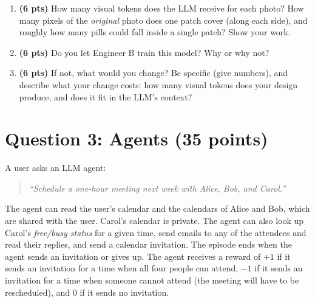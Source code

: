 \documentclass[11pt]{article}
\begin{document}
\begin{enumerate}[label=(\alph*)]
  \begin{enumerate}[label=(\roman*)]
    \item \textbf{(6 pts)} How many visual tokens does the LLM receive for each photo? How many pixels of the
    \emph{original} photo does one patch cover (along each side), and roughly how many pills could fall inside a
    single patch? Show your work.
    \item \textbf{(6 pts)} Do you let Engineer B train this model? Why or why not?
    \item \textbf{(6 pts)} If not, what would you change? Be specific (give numbers), and describe what your change
    costs: how many visual tokens does your design produce, and does it fit in the LLM's context?
  \end{enumerate}

\end{enumerate}

\section{Question 3: Agents (35 points)}

A user asks an LLM agent:
\begin{quote}
\emph{``Schedule a one-hour meeting next week with Alice, Bob, and Carol.''}
\end{quote}
The agent can read the user's calendar and the calendars of Alice and Bob, which are shared with the user. Carol's
calendar is private. The agent can also look up Carol's \emph{free/busy status} for a given time, send emails to
any of the attendees and read their replies, and send a calendar invitation. The episode ends when the agent sends
an invitation or gives up. The agent receives a reward of $+1$ if it sends an invitation for a time when all four
people can attend, $-1$ if it sends an invitation for a time when someone cannot attend (the meeting will have to
be rescheduled), and $0$ if it sends no invitation.
\end{document}
